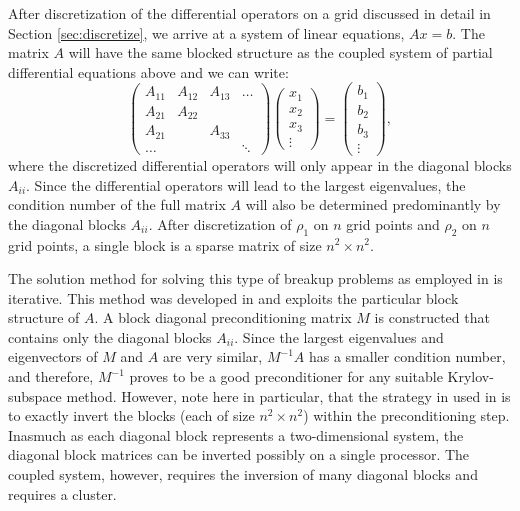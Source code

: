 \documentclass[mathpazo]{cicp}
\theoremstyle{definition}
\numberwithin{equation}{section}
\providecommand{\hbz}{}
\providecommand{\edt}{}
\begin{document}
After discretization of the differential operators on a grid \hbz{discussed in detail in Section \ref{sec:discretize}, we arrive at a system of linear equations,} $Ax=b$. The matrix \hbz{$A$} will have the same blocked structure as the coupled system of partial differential equations above and we can write:
\begin{equation}
 \begin{pmatrix}
  A_{11}   & A_{12}  &  A_{13} & \ldots \\
  A_{21}   & A_{22}  &    &  \\
  A_{21}   &      &  A_{33} &  \\
  \hdots  &    & & \ddots
 \end{pmatrix}
\begin{pmatrix}
x_1\\
x_2 \\
x_3\\
\vdots
\end{pmatrix}
= \begin{pmatrix}
  b_1\\
  b_2 \\
  b_3\\
\vdots
  \end{pmatrix},
\end{equation}
where the discretized differential operators will only appear in the
diagonal blocks $A_{ii}$. Since the differential operators
will lead to the largest eigenvalues, the condition number of the full matrix $A$ will also be determined
predominantly by the diagonal blocks $A_{ii}$. \edt{
After discretization of
$\rho_1$ on $n$ grid points and $\rho_2$ on $n$ grid points, a single
block is a sparse matrix of size $n^2 \times n^2$. }

\hbz{The solution method for solving this type of breakup problems as employed in \cite{Wim05} is iterative. This method was developed in \cite{baertschy2001solution} and exploits the particular block structure of $A$.} A block diagonal preconditioning matrix $M$ is constructed that contains only the diagonal blocks $A_{ii}$.  Since the largest eigenvalues and eigenvectors of $M$ and $A$ are very similar, $M^{-1}A$ has a smaller condition number, \hbz{and therefore, $M^{-1}$ proves to be a good preconditioner for any suitable Krylov-subspace method. However, note here in particular, that the strategy in used in \cite{Wim05} is to exactly invert the blocks \edt{(each of size $n^2 \times n^2$)} within the preconditioning step. Inasmuch as each diagonal block represents a two-dimensional system, the diagonal block matrices can be inverted \edt{possibly} on a single processor. The coupled system, however, requires the inversion of many diagonal blocks and requires a cluster.}
\end{document}
